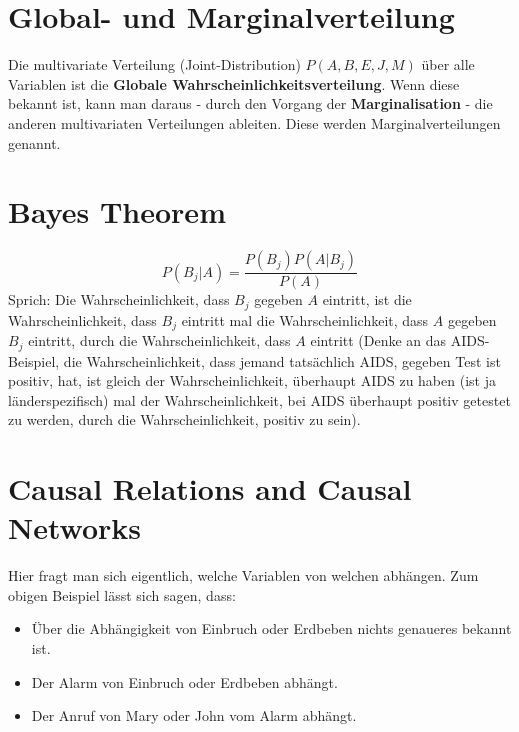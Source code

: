 \section{Global- und Marginalverteilung}
Die multivariate Verteilung (Joint-Distribution) $P(A,B,E,J,M)$ über alle Variablen ist die \textbf{Globale Wahrscheinlichkeitsverteilung}.
Wenn diese bekannt ist, kann man daraus - durch den Vorgang der \textbf{Marginalisation} - die anderen multivariaten Verteilungen ableiten. Diese werden Marginalverteilungen genannt.

\section{Bayes Theorem}
\[
P(B_j | A) = \frac{P(B_j) P(A | B_j)}{P(A)}
\]
Sprich: Die Wahrscheinlichkeit, dass $B_j$ gegeben $A$ eintritt, ist die Wahrscheinlichkeit, dass $B_j$ eintritt mal die Wahrscheinlichkeit, dass $A$ gegeben $B_j$ eintritt, durch die Wahrscheinlichkeit, dass $A$ eintritt (Denke an das AIDS-Beispiel, die Wahrscheinlichkeit, dass jemand tatsächlich AIDS, gegeben Test ist positiv, hat, ist gleich der Wahrscheinlichkeit, überhaupt AIDS zu haben (ist ja länderspezifisch) mal der Wahrscheinlichkeit, bei AIDS überhaupt positiv getestet zu werden, durch die Wahrscheinlichkeit, positiv zu sein).

\section{Causal Relations and Causal Networks}

Hier fragt man sich eigentlich, welche Variablen von welchen abhängen. Zum obigen Beispiel lässt sich sagen, dass:

\begin{minipage}{0.49\textwidth}
\begin{itemize}
\item Über die Abhängigkeit von Einbruch oder Erdbeben nichts genaueres bekannt ist.
\item Der Alarm von Einbruch oder Erdbeben abhängt.
\item Der Anruf von Mary oder John vom Alarm abhängt.
\end{itemize}
\end{minipage}
\begin{minipage}{0.49\textwidth}
\begin{center}
\label{fig:causalrelations}
\end{center}
\end{minipage}


